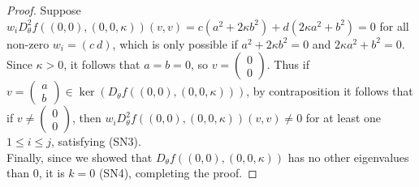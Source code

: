 \documentclass[10pt,a4paper]{amsart}
\begin{document}
\begin{proof}
Suppose $w_iD_\theta^2f((0,0),(0,0,\kappa))(v,v)= c(a^2+2\kappa b^2)+d(2\kappa a^2+b^2)=0$
for all non-zero $w_i = (c \ d)$, which is only possible if $a^2+2\kappa b^2=0$ and $2\kappa a^2+b^2=0$. Since $\kappa>0$, it follows that $a=b=0$, so $v=\begin{pmatrix} 0\\0 \end{pmatrix}$. Thus if $v = \begin{pmatrix}a\\b \end{pmatrix}\in \ker(D_{\theta} f((0,0),(0,0,\kappa)))$, by contraposition it follows that if $v \neq \begin{pmatrix} 0\\0\end{pmatrix}$, then $w_iD_\theta^2f((0,0),(0,0,\kappa))(v,v)\neq 0$ for at least one $1\leq i\leq j$, satisfying (SN3).\\

 Finally, since we showed that $D_{\theta} f((0,0),(0,0,\kappa))$ has no other eigenvalues than $0$, it is $k=0$ (SN4), completing the proof.
\end{proof}
\end{document}
